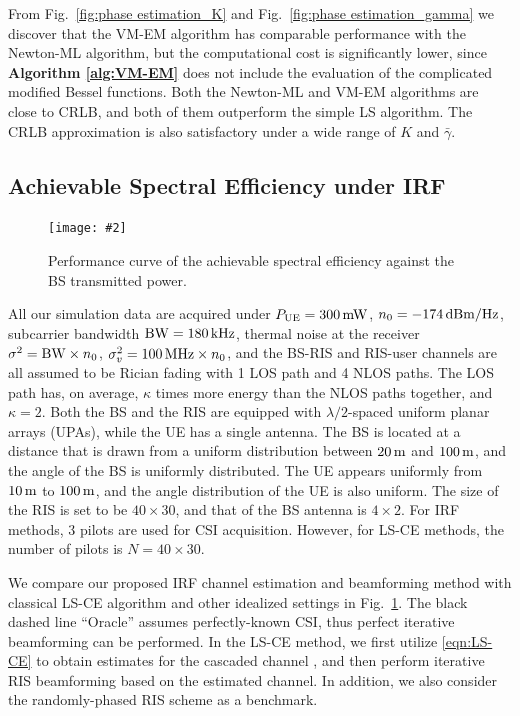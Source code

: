 \documentclass[12pt,draftclsnofoot,journal,onecolumn]{IEEEtran}
\theoremstyle{nonumberplain}
\newcommand{\myincludegraphics}[2][width=12cm]{\texttt{[image: \#2]}}
\begin{document}
    From Fig.~\ref{fig:phase estimation_K} and Fig.~\ref{fig:phase estimation_gamma} we discover that the VM-EM algorithm has comparable performance with the Newton-ML algorithm, but the computational cost is significantly lower, since {\bf Algorithm \ref{alg:VM-EM}} does not include the evaluation of the complicated modified Bessel functions. Both the Newton-ML and VM-EM algorithms are close to CRLB, and both of them outperform the simple LS algorithm. The CRLB approximation is also satisfactory under a wide range of $K$ and $\bar{\gamma}$. 

\subsection{Achievable Spectral Efficiency under IRF} \label{Achievable Spectral Efficiency under IRF}
    \begin{figure}[!t]
        \centering
        \myincludegraphics{data/rate.pdf}
        \caption{Performance curve of the achievable spectral efficiency against the BS transmitted power.}
        \label{fig:rate}
    \end{figure}
    All our simulation data are acquired under $P_{\rm UE}=300 \,{\rm mW}$, $n_0=-174\,{\rm dBm/Hz}$, subcarrier bandwidth ${\rm BW} = 180\,{\rm kHz}$, thermal noise at the receiver $\sigma^2 = {\rm BW}\times n_0$, $\sigma_v^2=100\,{\rm MHz}\times n_0$, and the BS-RIS and RIS-user channels are all assumed to be Rician fading with 1 LOS path and 4 NLOS paths. The LOS path has, on average, $\kappa$ times more energy than the NLOS paths together, and $\kappa=2$. Both the BS and the RIS are equipped with $\lambda/2$-spaced uniform planar arrays (UPAs), while the UE has a single antenna. The BS is located at a distance that is drawn from a uniform distribution between $20\,{\rm m}$ and $100\,{\rm m}$, and the angle of the BS is uniformly distributed. The UE appears uniformly from $10\,{\rm m}$ to $100\,{\rm m}$, and the angle distribution of the UE is also uniform. The size of the RIS is set to be $40\times 30$, and that of the BS antenna is $4\times 2$. For IRF methods, 3 pilots are used for CSI acquisition. 
    However, for LS-CE methods, the number of pilots is $N=40\times 30$. 

    We compare our proposed \ac{IRF} channel estimation and beamforming method with classical LS-CE algorithm and other idealized settings in Fig.~\ref{fig:rate}. The black dashed line ``Oracle'' assumes perfectly-known CSI, thus perfect iterative beamforming can be performed. In the LS-CE method, we first utilize \eqref{eqn:LS-CE} to obtain estimates for the cascaded channel \cite{kundu2021channel,wei2021channel}, and then perform iterative RIS beamforming based on the estimated channel. In addition, we also consider the randomly-phased RIS scheme as a benchmark.  
\end{document}

